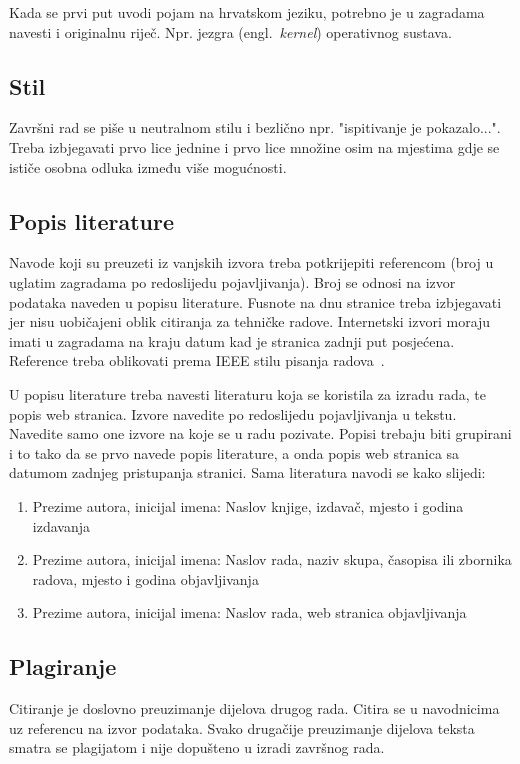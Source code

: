 Kada se prvi put uvodi pojam na hrvatskom jeziku, potrebno je u zagradama navesti i originalnu riječ. Npr. jezgra (engl.~\textit{kernel}) operativnog sustava.  
\subsection{Stil}

Završni rad se piše u neutralnom stilu i bezlično npr. "ispitivanje je pokazalo...". 
Treba izbjegavati prvo lice jednine i prvo lice množine osim na mjestima gdje se ističe osobna odluka između više mogućnosti. 
\subsection{Popis literature}

Navode koji su preuzeti iz vanjskih izvora treba potkrijepiti referencom (broj u uglatim zagradama po redoslijedu pojavljivanja). Broj se odnosi na izvor podataka naveden u popisu literature. Fusnote na dnu stranice treba izbjegavati jer nisu uobičajeni oblik citiranja za tehničke radove. Internetski izvori moraju imati u zagradama na kraju datum kad je stranica zadnji put posjećena. Reference treba oblikovati prema IEEE stilu pisanja radova~\cite{IEEE}.

U popisu literature treba navesti literaturu koja se koristila za izradu rada, te popis web stranica. Izvore navedite po redoslijedu pojavljivanja u tekstu. Navedite samo one izvore na koje se u radu pozivate. Popisi trebaju biti 
grupirani i to tako da se prvo navede popis literature, a onda 
popis web stranica sa datumom zadnjeg pristupanja stranici.
Sama literatura navodi se kako slijedi:
\begin{enumerate}
\item 
Prezime autora, inicijal imena: Naslov knjige, izdavač, mjesto i godina izdavanja
\item Prezime autora, inicijal imena: Naslov rada, naziv skupa, časopisa ili zbornika radova,
mjesto i godina objavljivanja
\item Prezime autora, inicijal imena: Naslov rada, web stranica objavljivanja
\end{enumerate}

\subsection{Plagiranje}

Citiranje je doslovno preuzimanje dijelova drugog rada. Citira se u navodnicima uz referencu na izvor podataka. 
Svako drugačije preuzimanje dijelova teksta 
smatra se plagijatom i nije dopušteno u izradi završnog rada. 

